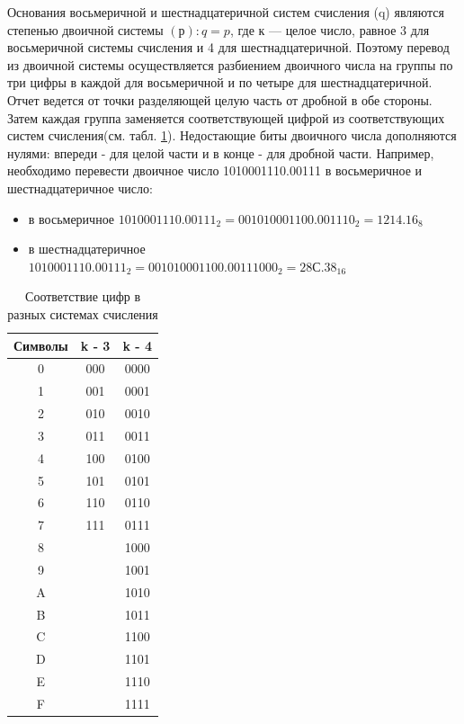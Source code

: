 \documentclass[a4paper]{article}
\begin{document}
Основания восьмеричной и шестнадцатеричной систем счисления (q) являются степенью двоичной системы $(р):q=p$, где к --- целое число, равное 3 для восьмеричной системы счисления и 4 для шестнадцатеричной. Поэтому перевод из двоичной системы осуществляется разбиением двоичного числа на группы по три цифры в каждой для восьмеричной и по четыре для шестнадцатеричной. Отчет ведется от точки разделяющей целую часть от дробной в обе стороны. Затем каждая группа заменяется соответствующей цифрой из соответствующих систем счисления(см. табл. \ref{tab:octhex}). Недостающие биты двоичного числа дополняются нулями: впереди - для целой части и в конце - для дробной части. Например, необходимо перевести двоичное число 1010001110.00111 в восьмеричное и шестнадцатеричное число:
\begin{itemize}
  \item в восьмеричное $1010001110.00111_{2} = 001 010 001 100.001 110_{2} = 1214.16_{8}$
  \item в шестнадцатеричное $1010001110.00111_{2} = 0010 1000 1100.0011 1000_{2} = 28С.38_{16}$
\end{itemize}

\begin{table}[h]
  \caption{Соответствие цифр в разных системах счисления}
  \begin{center}\label{tab:octhex}
    \begin{tabular}{|c|c|c|}
      \hline
     Символы & k - 3 & k - 4 \\
     \hline
      0 & 000 & 0000 \\
      1 & 001 & 0001 \\
      2 & 010 & 0010 \\
      3 & 011 & 0011 \\
      4 & 100 & 0100 \\
      5 & 101 & 0101 \\
      6 & 110 & 0110 \\
      7 & 111 & 0111 \\
      8 &     & 1000 \\
      9 &     & 1001 \\
      A &     & 1010 \\
      B &     & 1011 \\
      C &     & 1100 \\
      D &     & 1101 \\
      E &     & 1110 \\
      F &     & 1111 \\
      \hline
     \end{tabular}
  \end{center}
\end{table}
\end{document}
